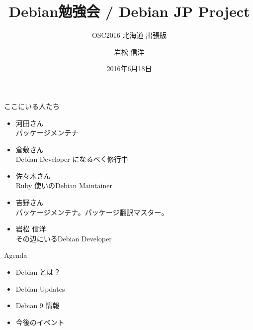 \title{Debian勉強会 / Debian JP Project}
\subtitle{OSC2016 北海道 出張版}
\author{岩松 信洋}
\date{2016年6月18日}



\begin{frame}
\titlepage{}
\end{frame}


\begin{frame}{ここにいる人たち}
\pause
\begin{itemize}[<+->]
\item 河田さん\\ 
	パッケージメンテナ  \pause
\item 倉敷さん \\ 
	Debian Developer になるべく修行中 \pause
\item 佐々木さん \\
	Ruby 使いのDebian Maintainer \pause
\item 吉野さん \\
	パッケージメンテナ。パッケージ翻訳マスター。\pause
\item 岩松 信洋 \\
	その辺にいるDebian Developer \pause
\end{itemize} 
\end{frame}

\begin{frame}{Agenda}
  \begin{itemize}
   \item Debian とは？
   \item Debian Updates
   \item Debian 9 情報
   \item 今後のイベント
  \end{itemize}
\end{frame}

